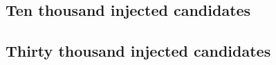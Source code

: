 \documentclass[11pt]{article}
\begin{document}
\clearpage
\subsection{Ten thousand injected candidates}
\begin{table}[H]\centering\small

\caption{Primary fits for $N=10{,}000$; \ToyCount{} toys per row.
Column definitions are given at the start of Appendix~B.}
\end{table}

\clearpage
\subsection{Thirty thousand injected candidates}
\begin{table}[H]\centering\small

\caption{Primary fits for $N=30{,}000$; \ToyCount{} toys per row.
Column definitions are given at the start of Appendix~B.}
\end{table}
\end{document}
